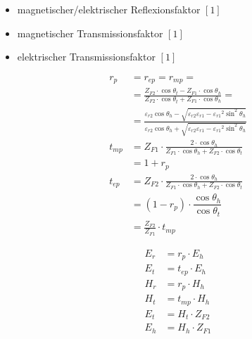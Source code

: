 \begin{itemize}
    \item magnetischer/elektrischer Reflexionsfaktor $[1]$
    \item magnetischer Transmissionsfaktor $[1]$
    \item elektrischer Transmissionsfaktor $[1]$
\end{itemize}
\begin{align*}
    r_p    & =  r_{ep} = r_{mp} =                                                                                                                                                                                                        \\
           & = \frac{Z_{F2} \cdot \cos \theta_t-Z_{F1} \cdot \cos \theta_h}{Z_{F2} \cdot \cos \theta_t+Z_{F1} \cdot \cos \theta_h} =                                                                                                     \\
           & = \frac{\varepsilon_{r2}\cos\theta_h-\sqrt{\varepsilon_{r2}\varepsilon_{r1}-{\varepsilon_{r1}}^2\sin^2\theta_h}}{\varepsilon_{r2}\cos\theta_h+\sqrt{{\varepsilon_{r2}\varepsilon_{r1}-{\varepsilon_{r1}}^2\sin^2\theta_h}}} \\
    t_{mp} & = Z_{F1} \cdot \frac{2 \cdot \cos \theta_h}{Z_{F1} \cdot \cos \theta_h+Z_{F2} \cdot \cos \theta_t}                                                                                                                          \\
           & = 1+r_p                                                                                                                                                                                                                     \\
    t_{ep} & = Z_{F2} \cdot \frac{2 \cdot \cos \theta_h}{Z_{F1} \cdot \cos \theta_h+Z_{F2} \cdot \cos \theta_t}                                                                                                                          \\
           & = (1-r_p) \cdot \dfrac{\cos \theta_h}{\cos \theta_t}                                                                                                                                                                        \\
           & = \frac{Z_{F2}}{Z_{F1}}\cdot t_{mp}
\end{align*}

\begin{align*}
    E_r & = r_p\cdot E_h    \\
    E_t & = t_{ep}\cdot E_h \\
    H_r & = r_p\cdot H_h    \\
    H_t & = t_{mp}\cdot H_h \\
    E_t & = H_t\cdot Z_{F2} \\
    E_h & = H_h\cdot Z_{F1}
\end{align*}

